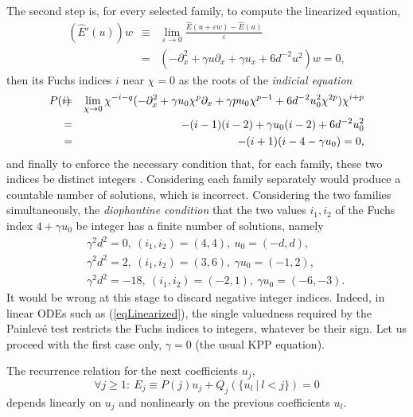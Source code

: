 \documentclass[10pt]{article}
\begin{document}
The second step is, for every selected family,
to compute the linearized equation,
\begin{eqnarray}
(\hat E'(u)) w
& \equiv &
\lim_{\varepsilon \to 0}
\frac{\hat E(u+\varepsilon w)-\hat E(u)}{\varepsilon}
\nonumber
\\
&=&(- \partial_x^2 + \gamma u \partial_x + \gamma u_x + 6 d^{-2} u^2) w=0,
\label{eqLinearized}
\end{eqnarray}
then its Fuchs indices $i$ near $\chi=0$
as the roots of the \textit{indicial equation}
\begin{eqnarray}
P(i)
{\hskip-3.0truemm}
& = &
\lim_{\chi \to 0} \chi^{-i-q}
(- \partial_x^2 + \gamma u_0 \chi^p \partial_x
  + \gamma p u_0 \chi^{p-1}+ 6 d^{-2} u_0^2 \chi^{2p})
 \chi^{i+p}
\\
{\hskip-3.0truemm}
& = &
  -(i-1)(i-2) + \gamma u_0 (i-2) + 6 d^{-2} u_0^2
\\
{\hskip-3.0truemm}
& = &
 -(i+1)(i-4- \gamma u_0)=0,
\end{eqnarray}
and finally to enforce the necessary condition that,
for each family, these two indices be distinct integers \cite{FP1991,CFP1993}.
Considering each family separately would produce a countable number of
solutions, which is incorrect.
Considering the two families simultaneously,
the
\textit{diophantine condition} that
the two values $i_1,i_2$ of the Fuchs index $4+\gamma u_0$ be integer
has a finite number of solutions, namely \cite[App.~I]{BureauMI}
\begin{eqnarray}
   & & \gamma^2 d^2=0,\   (i_1,i_2)=(4,4),\         u_0=(-d,d),
\\ & & \gamma^2 d^2=2,\   (i_1,i_2)=(3,6),\  \gamma u_0=(-1,2),
\\ & & \gamma^2 d^2=-18,\ (i_1,i_2)=(-2,1),\ \gamma u_0=(-6,-3).
\end{eqnarray}
It would be wrong at this stage to discard negative integer indices.
Indeed, in linear ODEs such as (\ref{eqLinearized}),
the single valuedness required by the Painlev\'e test restricts the
Fuchs indices to integers, whatever be their sign.
Let us proceed with the first case only, $\gamma=0$ (the usual KPP equation).

The recurrence relation for the next coefficients $u_j$,
\begin{equation}
\forall j\ge 1:\
E_j \equiv P(j) u_j + Q_j(\{u_l\ \vert \ l<j \}) = 0
\label{eqMethodPole5}
\end{equation}
depends linearly on $u_j$
and nonlinearly on the previous coefficients $u_l$.
\end{document}
